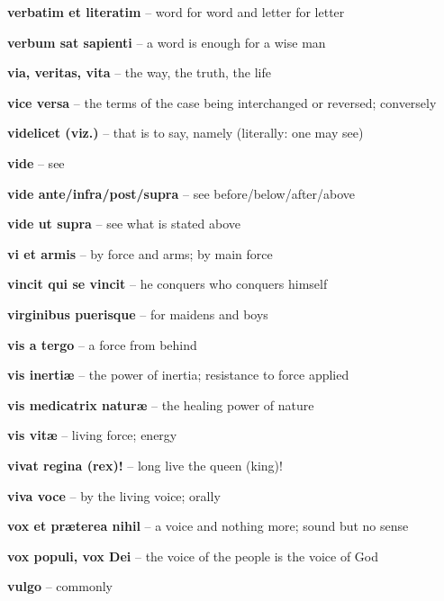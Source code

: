 \documentclass[12pt]{article}
\newcommand{\lat}[1]{\textbf{#1}}
\begin{document}
\lat{verbatim et literatim} -- word for word and letter for letter

\lat{verbum sat sapienti} -- a word is enough for a wise man

\lat{via, veritas, vita} -- the way, the truth, the life

\lat{vice versa} -- the terms of the case being interchanged or reversed; conversely

\lat{videlicet (viz.)} -- that is to say, namely (literally: one may see)

\lat{vide} -- see

\lat{vide ante/infra/post/supra} -- see before/below/after/above

\lat{vide ut supra} -- see what is stated above

\lat{vi et armis} -- by force and arms; by main force

\lat{vincit qui se vincit} -- he conquers who conquers himself

\lat{virginibus puerisque} -- for maidens and boys

\lat{vis a tergo} -- a force from behind

\lat{vis inerti\ae} -- the power of inertia; resistance to force applied

\lat{vis medicatrix natur\ae} -- the healing power of nature

\lat{vis vit\ae} -- living force; energy

\lat{vivat regina (rex)!} -- long live the queen (king)!

\lat{viva voce} -- by the living voice; orally

\lat{vox et pr{\ae}terea nihil} -- a voice and nothing more; sound but no sense

\lat{vox populi, vox Dei} -- the voice of the people is the voice of God

\lat{vulgo} -- commonly
\end{document}
